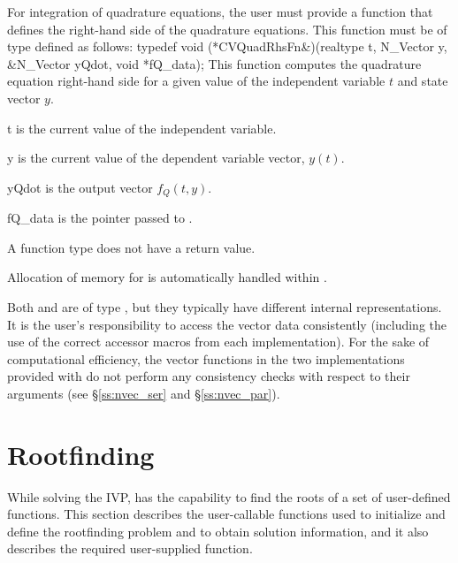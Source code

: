 For integration of quadrature equations, the user must provide a function 
that defines the right-hand side of the quadrature equations. This function
must be of type  defined as follows:
{
  typedef void (*CVQuadRhsFn&)(realtype t, N\_Vector y, \\
                            &N\_Vector yQdot, void *fQ\_data);
}
{
  This function computes the quadrature equation right-hand side for a given value
  of the independent variable $t$ and state vector $y$.
}
{
  \begin{args}[fQ\_data]
  \item[t]
    is the current value of the independent variable.
  \item[y]
    is the current value of the dependent variable vector, $y(t)$.
  \item[yQdot]
    is the output vector $f_Q(t,y)$.
  \item[fQ\_data]
    is the       
    pointer passed to .   
  \end{args}
}
{
  A  function type does not have a return value.
}
{
  Allocation of memory for  is automatically handled within {\cvodes}.

  Both  and  are of type ,
  but they  typically have different internal representations. It is the user's 
  responsibility to access the vector data consistently (including the use of the 
  correct accessor macros from each {\nvector} implementation). For the sake of 
  computational efficiency, the vector functions in the two {\nvector} implementations 
  provided with {\cvodes} do not perform any consistency checks with respect to their 
   arguments (see \S\ref{ss:nvec_ser} and \S\ref{ss:nvec_par}).
}

\section{Rootfinding}\label{s:using_rootfinding}

While solving the IVP, {\cvodes} has the capability to find the
roots of a set of user-defined functions. This section describes the
user-callable functions used to initialize and define the rootfinding
problem and to obtain solution information, and it also describes the
required user-supplied function.

